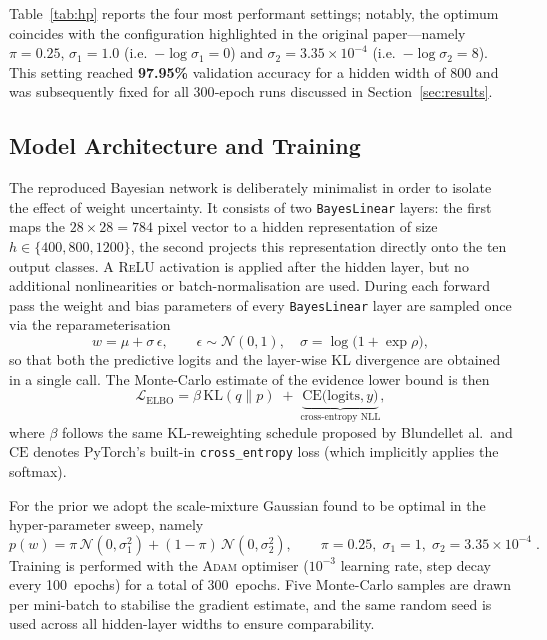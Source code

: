 \documentclass{article}
\begin{document}
Table~\ref{tab:hp} reports the four most performant settings; notably, the optimum coincides with the configuration highlighted in the original paper—namely $\pi=0.25$, $\sigma_{1}=1.0$ (i.e.\ $-\!\log\sigma_1=0$) and $\sigma_{2}=3.35\times10^{-4}$ (i.e.\ $-\!\log\sigma_2=8$).  
This setting reached \textbf{97.95\%} validation accuracy for a hidden width of 800 and was subsequently fixed for all 300‑epoch runs discussed in Section~\ref{sec:results}.

\subsection{Model Architecture and Training}

The reproduced Bayesian network is deliberately minimalist in order to isolate the effect of weight uncertainty.  It consists of two \texttt{BayesLinear} layers: the first maps the $28\times28=784$ pixel vector to a hidden representation of size $h\in\{400,800,1200\}$, the second projects this representation directly onto the ten output classes.  A \textsc{ReLU} activation is applied after the hidden layer, but no additional nonlinearities or batch-normalisation are used.  During each forward pass the weight and bias parameters of every \texttt{BayesLinear} layer are sampled once via the reparameterisation
\[
w = \mu + \sigma \,\epsilon,\qquad 
\epsilon\sim\mathcal{N}(0,1),\quad 
\sigma=\log\!\bigl(1+\exp\rho\bigr),
\]
so that both the predictive logits and the layer-wise KL divergence are obtained in a single call.  The Monte-Carlo estimate of the evidence lower bound is then
\[
\mathcal{L}_{\text{ELBO}} = \beta\,\text{KL}(q\|p)\;+\;
\underbrace{\text{CE}\bigl(\text{logits},y\bigr)}_{\text{cross-entropy NLL}},
\]
where $\beta$ follows the same KL-reweighting schedule proposed by Blundell\;et al.\ and $\text{CE}$ denotes PyTorch’s built-in \texttt{cross\_entropy} loss (which implicitly applies the softmax).

For the prior we adopt the scale-mixture Gaussian found to be optimal in the hyper-parameter sweep, namely
\[
p(w)=\pi\,\mathcal{N}(0,\sigma_1^2) + (1-\pi)\,\mathcal{N}(0,\sigma_2^2),
\qquad
\pi=0.25,\;\sigma_1=1,\;\sigma_2=3.35\times10^{-4}\;.
\]
Training is performed with the \textsc{Adam} optimiser ($10^{-3}$ learning rate, step decay every 100~epochs) for a total of 300~epochs.  Five Monte-Carlo samples are drawn per mini-batch to stabilise the gradient estimate, and the same random seed is used across all hidden-layer widths to ensure comparability.
\end{document}
